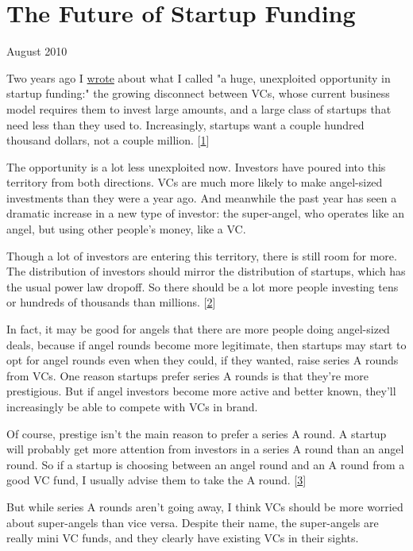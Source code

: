 \chapter{The Future of Startup Funding}





August 2010

Two years ago I
\href{http://www.paulgraham.com/googles.html\#next}{wrote} about what I called "a huge, unexploited
opportunity in startup funding:" the growing disconnect between
VCs, whose current business model requires them to invest large
amounts, and a large class of startups that need less than they
used to.  Increasingly, startups want a couple hundred thousand
dollars, not a couple million. 
[\href{\#f1n}{1}]

The opportunity is a lot less unexploited now.  Investors have
poured into this territory from both directions.  VCs are much more
likely to make angel-sized investments than they were a year ago.
And meanwhile the past year has seen a dramatic increase in a new
type of investor: the super-angel, who operates like an angel, but
using other people's money, like a VC.

Though a lot of investors are entering this territory, there is
still room for more.  The distribution of investors should mirror
the distribution of startups, which has the usual power law dropoff.
So there should be a lot more people investing tens or hundreds of
thousands than millions. 
[\href{\#f2n}{2}]

In fact, it may be good for angels that there are more people doing
angel-sized deals, because if angel rounds become more legitimate,
then startups may start to opt for angel rounds even when they
could, if they wanted, raise series A rounds from VCs.  One reason
startups prefer series A rounds is that they're more prestigious.
But if angel investors become more active and better known, they'll
increasingly be able to compete with VCs in brand.

Of course, prestige isn't the main reason to prefer a series A
round.  A startup will probably get more attention from investors
in a series A round than an angel round.  So if a startup is choosing
between an angel round and an A round from a good VC fund, I usually
advise them to take the A round. 
[\href{\#f3n}{3}]

But while series A rounds aren't going away, I think VCs should be
more worried about super-angels than vice versa.  Despite their
name, the super-angels are really mini VC funds, and they clearly
have existing VCs in their sights.


